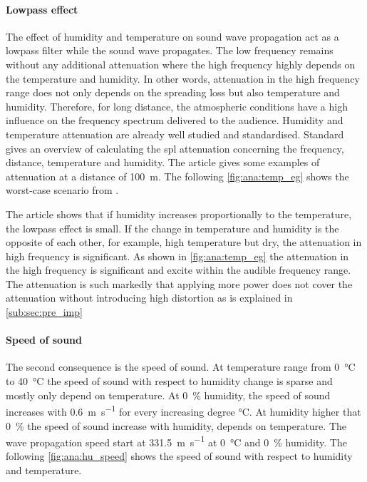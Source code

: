 \paragraph{Lowpass effect} The effect of humidity and temperature on sound wave propagation act as a lowpass filter while the sound wave propagates. The low frequency remains without any additional attenuation where the high frequency highly depends on the temperature and humidity. In other words, attenuation in the high frequency range does not only depends on the spreading loss but also temperature and humidity. Therefore, for long distance, the atmospheric conditions have a high influence on the frequency spectrum delivered to the audience. Humidity and temperature attenuation are already well studied and standardised. Standard \citep{iso_9613-1} gives an overview of calculating the \gls{spl}  attenuation concerning the frequency, distance, temperature and humidity. The article \citep{corteel2017large} gives some examples of attenuation at a distance of \SI{100}{\meter}.  The following \autoref{fig:ana:temp_eg} shows the worst-case scenario from \citep{corteel2017large}.

The article shows that if humidity increases proportionally to the temperature, the lowpass effect is small. If the change in temperature and humidity is the opposite of each other, for example, high temperature but dry, the attenuation in high frequency is significant. As shown in \autoref{fig:ana:temp_eg} the attenuation in the high frequency is significant and excite  within the audible frequency range. The attenuation is such markedly that applying more power does not cover the attenuation without introducing high distortion as is explained in \autoref{sub:sec:pre_imp}

\paragraph{Speed of sound} The second consequence is the speed of sound. At temperature range from \SI{0}{\celsius} to \SI{40}{\celsius} the speed of sound with respect to humidity change is sparse and mostly only depend on temperature. At \SI{0}{\percent} humidity, the speed of sound increases with \SI{0.6}{\meter\per\second} for every increasing degree \si{\celsius}. At humidity higher that \SI{0}{\percent} the speed of sound increase with humidity, depends on temperature. The wave propagation speed start at \SI{331.5}{\meter\per\second} at \SI{0}{\celsius} and \SI{0}{\percent} humidity. The following \autoref{fig:ana:hu_speed} shows the speed of sound with respect to humidity and temperature. 

